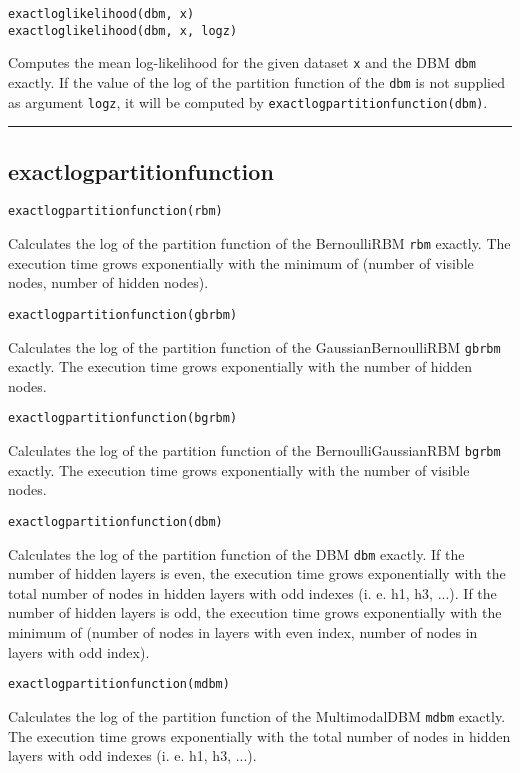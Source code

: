\begin{verbatim}
exactloglikelihood(dbm, x)
exactloglikelihood(dbm, x, logz)
\end{verbatim}
Computes the mean log-likelihood for the given dataset \texttt{x} and the DBM \texttt{dbm} exactly. If the value of the log of the partition function of the \texttt{dbm} is not supplied as argument \texttt{logz}, it will be computed by \texttt{exactlogpartitionfunction(dbm)}.

\noindent\rule{\textwidth}{1pt}
\subsection*{exactlogpartitionfunction}
\begin{verbatim}
exactlogpartitionfunction(rbm)
\end{verbatim}
Calculates the log of the partition function of the BernoulliRBM \texttt{rbm} exactly. The execution time grows exponentially with the minimum of (number of visible nodes, number of hidden nodes).

\begin{verbatim}
exactlogpartitionfunction(gbrbm)
\end{verbatim}
Calculates the log of the partition function of the GaussianBernoulliRBM \texttt{gbrbm} exactly. The execution time grows exponentially with the number of hidden nodes.

\begin{verbatim}
exactlogpartitionfunction(bgrbm)
\end{verbatim}
Calculates the log of the partition function of the BernoulliGaussianRBM \texttt{bgrbm} exactly. The execution time grows exponentially with the number of visible nodes.

\begin{verbatim}
exactlogpartitionfunction(dbm)
\end{verbatim}
Calculates the log of the partition function of the DBM \texttt{dbm} exactly. If the number of hidden layers is even, the execution time grows exponentially with the total number of nodes in hidden layers with odd indexes (i. e. h1, h3, ...). If the number of hidden layers is odd, the execution time grows exponentially with the minimum of (number of nodes in layers with even index, number of nodes in layers with odd index).

\begin{verbatim}
exactlogpartitionfunction(mdbm)
\end{verbatim}
Calculates the log of the partition function of the MultimodalDBM \texttt{mdbm} exactly. The execution time grows exponentially with the total number of nodes in hidden layers with odd indexes (i. e. h1, h3, ...).

